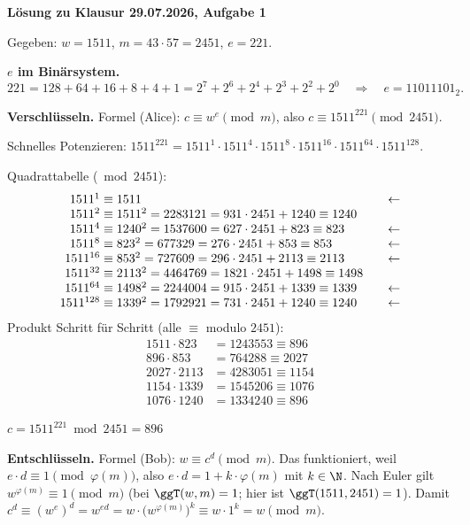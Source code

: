 \textbf{Lösung zu Klausur 29.07.2026, Aufgabe 1}

Gegeben: $w = 1511$, $m = 43 \cdot 57 = 2451$, $e = 221$.

 \textbf{$e$ im Binärsystem.}
\[
221 = 128 + 64 + 16 + 8 + 4 + 1 = 2^7 + 2^6 + 2^4 + 2^3 + 2^2 + 2^0
\quad\Rightarrow\quad e = 11011101_2 .
\]

 \textbf{Verschlüsseln.} Formel (Alice): $c \equiv w^e \pmod m$, also $c \equiv 1511^{221} \pmod{2451}$.

Schnelles Potenzieren: $1511^{221} = 1511^{1} \cdot 1511^{4} \cdot 1511^{8} \cdot 1511^{16} \cdot 1511^{64} \cdot 1511^{128}$.

Quadrattabelle ($\bmod 2451$):
\[
\begin{array}{r@{\;\equiv\;}l@{\qquad}l}
1511^{1}   & 1511 & \leftarrow\\
1511^{2}   & 1511^2 = 2283121 = 931 \cdot 2451 + 1240 \equiv 1240 & \\
1511^{4}   & 1240^2 = 1537600 = 627 \cdot 2451 + 823 \equiv 823 & \leftarrow\\
1511^{8}   & 823^2 = 677329 = 276 \cdot 2451 + 853 \equiv 853 & \leftarrow\\
1511^{16}  & 853^2 = 727609 = 296 \cdot 2451 + 2113 \equiv 2113 & \leftarrow\\
1511^{32}  & 2113^2 = 4464769 = 1821 \cdot 2451 + 1498 \equiv 1498 & \\
1511^{64}  & 1498^2 = 2244004 = 915 \cdot 2451 + 1339 \equiv 1339 & \leftarrow\\
1511^{128} & 1339^2 = 1792921 = 731 \cdot 2451 + 1240 \equiv 1240 & \leftarrow
\end{array}
\]
Produkt Schritt für Schritt (alle $\equiv$ modulo $2451$):
\begin{align*}
1511 \cdot 823 &= 1243553 \equiv 896\\
896 \cdot 853 &= 764288 \equiv 2027\\
2027 \cdot 2113 &= 4283051 \equiv 1154\\
1154 \cdot 1339 &= 1545206 \equiv 1076\\
1076 \cdot 1240 &= 1334240 \equiv 896
\end{align*}
\begin{ergebnis} $c = 1511^{221} \bmod 2451 = 896$ \end{ergebnis}

 \textbf{Entschlüsseln.} Formel (Bob): $w \equiv c^d \pmod m$.
Das funktioniert, weil $e \cdot d \equiv 1 \pmod{\varphi(m)}$, also $e \cdot d = 1 + k \cdot \varphi(m)$ mit $k \in \N$.
Nach Euler gilt $w^{\varphi(m)} \equiv 1 \pmod m$ (bei $\ggT(w, m) = 1$; hier ist $\ggT(1511, 2451) = 1$). Damit
$c^d \equiv (w^e)^d = w^{ed} = w \cdot \bigl(w^{\varphi(m)}\bigr)^k \equiv w \cdot 1^k = w \pmod m$.

